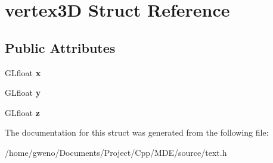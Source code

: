 \hypertarget{structvertex3D}{}\section{vertex3D Struct Reference}
\label{structvertex3D}
\subsection*{Public Attributes}
\begin{DoxyCompactItemize}
\item 
G\+Lfloat {\bfseries x}\hypertarget{structvertex3D_a4978ede0a4f2c61a01ef744f8d7f145d}{}\label{structvertex3D_a4978ede0a4f2c61a01ef744f8d7f145d}

\item 
G\+Lfloat {\bfseries y}\hypertarget{structvertex3D_a7122df830cd0f15f1085ff74ff5e0802}{}\label{structvertex3D_a7122df830cd0f15f1085ff74ff5e0802}

\item 
G\+Lfloat {\bfseries z}\hypertarget{structvertex3D_aff2f2ff22802037172bd8c12b7474f16}{}\label{structvertex3D_aff2f2ff22802037172bd8c12b7474f16}

\end{DoxyCompactItemize}


The documentation for this struct was generated from the following file\+:\begin{DoxyCompactItemize}
\item 
/home/gweno/\+Documents/\+Project/\+Cpp/\+M\+D\+E/source/text.\+h\end{DoxyCompactItemize}
